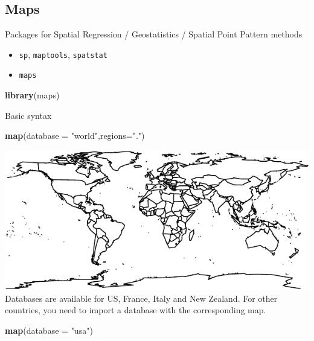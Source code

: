 \documentclass[]{article}
\def\tightlist{}
\newenvironment{Shaded}{\begin{snugshade}}{\end{snugshade}}
\newcommand{\KeywordTok}[1]{\textcolor[rgb]{0.13,0.29,0.53}{\textbf{{#1}}}}
\newcommand{\DataTypeTok}[1]{\textcolor[rgb]{0.13,0.29,0.53}{{#1}}}
\newcommand{\StringTok}[1]{\textcolor[rgb]{0.31,0.60,0.02}{{#1}}}
\newcommand{\NormalTok}[1]{{#1}}
\numberwithin{equation}{section}
\begin{document}
\subsection{Maps}\label{maps}

Packages for Spatial Regression / Geostatistics / Spatial Point Pattern
methods

\begin{itemize}
\tightlist
\item
  \texttt{sp}, \texttt{maptools}, \texttt{spatstat}
\item
  \texttt{maps}
\end{itemize}

\begin{Shaded}
\begin{Highlighting}[]
\KeywordTok{library}\NormalTok{(maps)}
\end{Highlighting}
\end{Shaded}

Basic syntax

\begin{Shaded}
\begin{Highlighting}[]
\KeywordTok{map}\NormalTok{(}\DataTypeTok{database =} \StringTok{"world"}\NormalTok{,}\DataTypeTok{regions=}\StringTok{"."}\NormalTok{)}
\end{Highlighting}
\end{Shaded}

\includegraphics{index_files/figure-latex/unnamed-chunk-238-1.pdf}
Databases are available for US, France, Italy and New Zealand. For other
countries, you need to import a database with the corresponding map.

\begin{Shaded}
\begin{Highlighting}[]
\KeywordTok{map}\NormalTok{(}\DataTypeTok{database =} \StringTok{"usa"}\NormalTok{)}
\end{Highlighting}
\end{Shaded}
\end{document}
